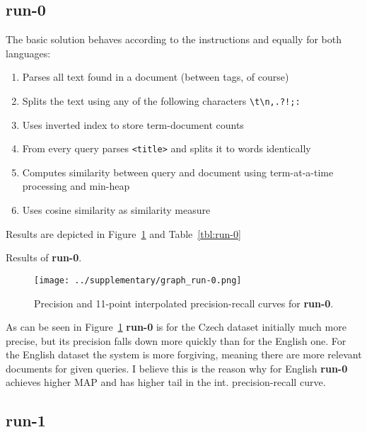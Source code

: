 \documentclass[10pt]{article}
\newcommand{\Run}[1]{\textbf{#1}}
\begin{document}
\subsection{run-0}


The basic solution behaves according to the instructions and equally for both
languages:

\begin{enumerate}
    \item Parses all text found in a document (between tags, of course)
    \item Splits the text using any of the following characters
        \textvisiblespace\verb|\t\n,.?!;:|
    \item Uses inverted index to store term-document counts
    \item From every query parses \verb|<title>| and splits it to words
        identically
    \item Computes similarity between query and document using term-at-a-time
        processing and min-heap
    \item Uses cosine similarity as similarity measure
\end{enumerate}

Results are depicted in Figure~\ref{fig:run-0} and Table~\ref{tbl:run-0}

\begin{table}[h]
\centering

    \caption{Results of \Run{run-0}.\label{tbl:run-0}}
\end{table}

\begin{figure}[h]
\centering
\texttt{[image: ../supplementary/graph\_run-0.png]}
    \caption{Precision and 11-point interpolated precision-recall curves for
    \Run{run-0}.\label{fig:run-0}}
\end{figure}

As can be seen in Figure~\ref{fig:run-0} \Run{run-0} is for the Czech dataset
initially much more precise, but its precision falls down more quickly than for
the English one. For the English dataset the system is more forgiving, meaning
there are more relevant documents for given queries. I believe this is the
reason why for English \Run{run-0} achieves higher MAP and has higher tail in
the int. precision-recall curve.

\subsection{run-1}
\end{document}
